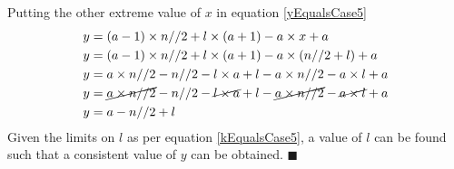 \documentclass[10pt, twoside]{article}
\begin{document}
Putting the other extreme value of $x$ in equation \eqref{yEqualsCase5}
\begin{align*}
	y &= (a-1)\times n//2 + l\times(a+1) - a\times x + a \\
	y &= (a-1)\times n//2 + l\times(a+1) - a\times (n//2+l) + a \\	
	y &= a\times n//2 - n//2 - l\times a + l -a\times n//2 - a \times l + a \\
	y &= \cancel{a\times n//2} - n//2 - \cancel{l\times a} + l -\cancel{a\times n//2} - \cancel{a \times l} + a \\
	y &= a - n//2 + l \\
\end{align*}
Given the limits on $l$ as per equation \eqref{kEqualsCase5}, a value of $l$ can be found such that a consistent value of $y$ can be obtained. $\blacksquare$\\
\end{document}

